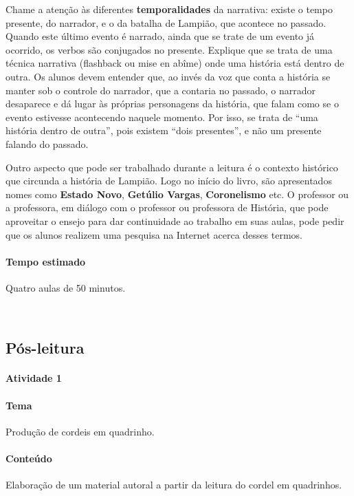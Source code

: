 \documentclass[11pt]{extarticle}
\begin{document}
Chame a atenção às diferentes \textbf{temporalidades} da narrativa: existe o tempo presente, do narrador,
e o da batalha de Lampião, que acontece no passado. Quando este último evento é narrado, ainda que 
se trate de um evento já ocorrido, os verbos são conjugados no presente. 
Explique que se trata de uma técnica narrativa (flashback ou mise en abîme) onde uma história
está dentro de outra. Os alunos devem entender que, ao invés da voz que conta a história se manter 
sob o controle do narrador, que a contaria no passado, o narrador desaparece e dá lugar às próprias 
personagens da história, que falam como se o evento estivesse acontecendo naquele momento. 
Por isso, se trata de ``uma história dentro de outra'', pois existem ``dois presentes'', e não
um presente falando do passado. 

Outro aspecto que pode ser trabalhado durante a leitura é o contexto histórico que circunda
a história de Lampião. Logo no início do livro, são apresentados nomes como \textbf{Estado Novo}, 
\textbf{Getúlio Vargas}, \textbf{Coronelismo} etc. O professor ou a professora, em diálogo com o professor ou professora
de História, que pode aproveitar o ensejo para dar continuidade ao trabalho em suas aulas,
pode pedir que os alunos realizem uma pesquisa na Internet acerca desses termos.


\paragraph{Tempo estimado} Quatro aulas de 50 minutos.

 
\subsection{Pós-leitura}

\paragraph{Atividade 1}


\paragraph{Tema} Produção de cordeis em quadrinho.

\paragraph{Conteúdo} Elaboração de um material autoral a partir da leitura
do cordel em quadrinhos.
\end{document}
